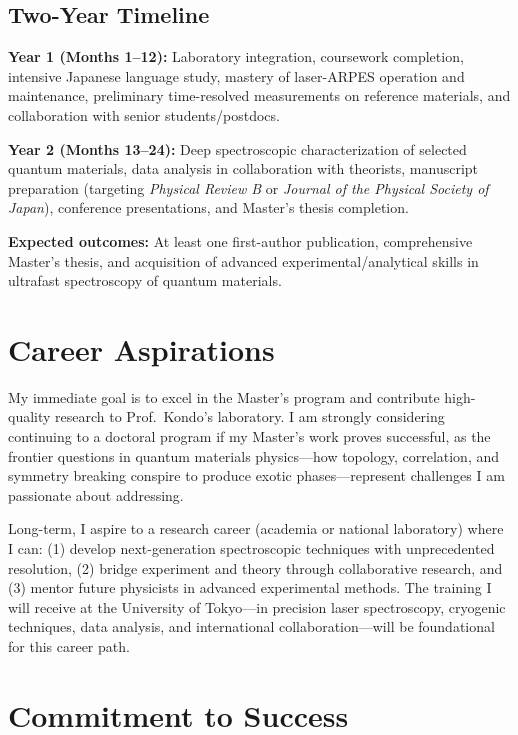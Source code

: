 \documentclass[11pt,a4paper]{article}
\begin{document}
\subsection{Two-Year Timeline}

\textbf{Year 1 (Months 1--12):} Laboratory integration, coursework completion, intensive Japanese language study, mastery of laser-ARPES operation and maintenance, preliminary time-resolved measurements on reference materials, and collaboration with senior students/postdocs.

\textbf{Year 2 (Months 13--24):} Deep spectroscopic characterization of selected quantum materials, data analysis in collaboration with theorists, manuscript preparation (targeting \textit{Physical Review B} or \textit{Journal of the Physical Society of Japan}), conference presentations, and Master's thesis completion.

\textbf{Expected outcomes:} At least one first-author publication, comprehensive Master's thesis, and acquisition of advanced experimental/analytical skills in ultrafast spectroscopy of quantum materials.

\section{Career Aspirations}

My immediate goal is to excel in the Master's program and contribute high-quality research to Prof.~Kondo's laboratory. I am strongly considering continuing to a doctoral program if my Master's work proves successful, as the frontier questions in quantum materials physics—how topology, correlation, and symmetry breaking conspire to produce exotic phases—represent challenges I am passionate about addressing.

Long-term, I aspire to a research career (academia or national laboratory) where I can: (1) develop next-generation spectroscopic techniques with unprecedented resolution, (2) bridge experiment and theory through collaborative research, and (3) mentor future physicists in advanced experimental methods. The training I will receive at the University of Tokyo—in precision laser spectroscopy, cryogenic techniques, data analysis, and international collaboration—will be foundational for this career path.

\section{Commitment to Success}
\end{document}
